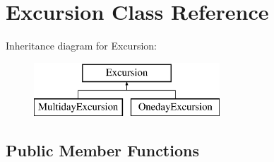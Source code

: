 \hypertarget{class_excursion}{}\section{Excursion Class Reference}
\label{class_excursion}
Inheritance diagram for Excursion\+:\begin{figure}[H]
\begin{center}
\leavevmode
\includegraphics[height=2.000000cm]{class_excursion}
\end{center}
\end{figure}
\subsection*{Public Member Functions}
